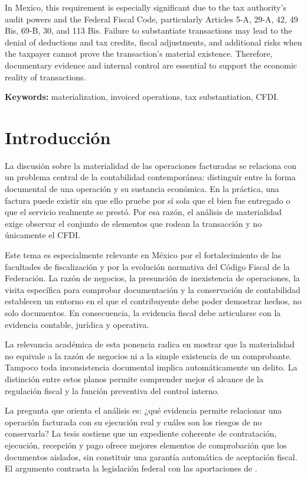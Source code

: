 \documentclass[spanish,12pt,letterpaper,oneside]{article}
\begin{document}
In Mexico, this requirement is especially significant due to the tax authority's audit powers and the Federal Fiscal Code, particularly Articles 5-A, 29-A, 42, 49 Bis, 69-B, 30, and 113 Bis. Failure to substantiate transactions may lead to the denial of deductions and tax credits, fiscal adjustments, and additional risks when the taxpayer cannot prove the transaction's material existence. Therefore, documentary evidence and internal control are essential to support the economic reality of transactions.

\textbf{Keywords:} materialization, invoiced operations, tax substantiation, CFDI.

\clearpage
\section*{Introducción}
La discusión sobre la materialidad de las operaciones facturadas se relaciona con un problema central de la contabilidad contemporánea: distinguir entre la forma documental de una operación y su sustancia económica. En la práctica, una factura puede existir sin que ello pruebe por sí sola que el bien fue entregado o que el servicio realmente se prestó. Por esa razón, el análisis de materialidad exige observar el conjunto de elementos que rodean la transacción y no únicamente el CFDI.

Este tema es especialmente relevante en México por el fortalecimiento de las facultades de fiscalización y por la evolución normativa del Código Fiscal de la Federación. La razón de negocios, la presunción de inexistencia de operaciones, la visita específica para comprobar documentación y la conservación de contabilidad establecen un entorno en el que el contribuyente debe poder demostrar hechos, no solo documentos. En consecuencia, la evidencia fiscal debe articularse con la evidencia contable, jurídica y operativa.

La relevancia académica de esta ponencia radica en mostrar que la materialidad no equivale a la razón de negocios ni a la simple existencia de un comprobante. Tampoco toda inconsistencia documental implica automáticamente un delito. La distinción entre estos planos permite comprender mejor el alcance de la regulación fiscal y la función preventiva del control interno.

La pregunta que orienta el análisis es: ¿qué evidencia permite relacionar una operación facturada con su ejecución real y cuáles son los riesgos de no conservarla? La tesis sostiene que un expediente coherente de contratación, ejecución, recepción y pago ofrece mejores elementos de comprobación que los documentos aislados, sin constituir una garantía automática de aceptación fiscal. El argumento contrasta la legislación federal con las aportaciones de \textcite{arrona2022certeza,rico2023mecanismo,rico2024consecuencias}.
\end{document}
